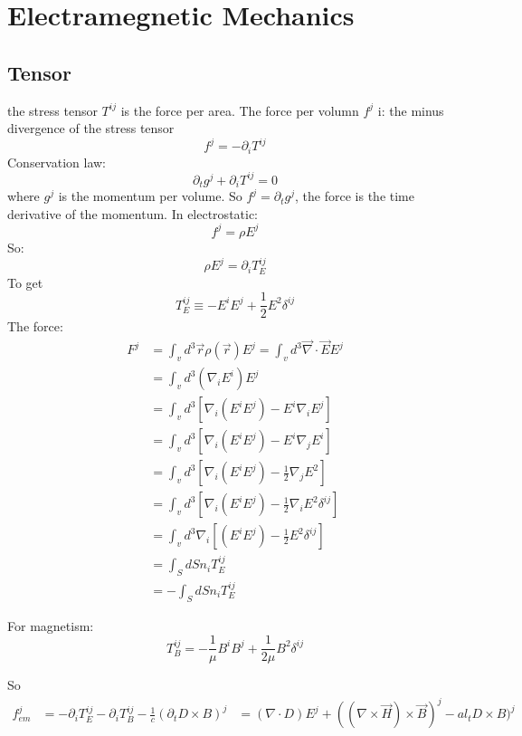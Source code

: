 \chapter{Electramegnetic Mechanics}

\section{Tensor}
the stress tensor $T^{ij}$ is the force per area. The force per volumn $f^j$
i: the minus divergence of the stress tensor
\[ f^j = -\partial_iT^{ij} \]
Conservation law:
\[  \partial_tg^j+\partial_iT^{ij} = 0 \]
where $g^j$ is the momentum per volume. So $f^j=\partial_tg^j$, the force is
the time derivative of the momentum.
In electrostatic:
\[  f^j = \rho E^j \]
So:
\[  \rho E^j = \partial_iT_E^{ij} \]
To get 
\[  T_E^{ij} \equiv -E^iE^j + \frac{1}{2}E^2\delta^{ij} \]
The force:
\begin{equation*}
\begin{aligned}  
    F^j &= \int_v d^3\vec{r}\rho(\vec{r})E^j = \int_v d^3\vec{\nabla}\cdot\vec{E}E^j	\\
	&= \int_v d^3(\nabla_iE^i)E^j \\
	&= \int_v d^3 [\nabla_i(E^iE^j) - E^i\nabla_iE^j ] \\
	&= \int_v d^3 [\nabla_i(E^iE^j) - E^i\nabla_jE^i ] \\
	&= \int_v d^3 [\nabla_i(E^iE^j) - \frac{1}{2}\nabla_jE^2 ] \\
	&= \int_v d^3 [\nabla_i(E^iE^j) - \frac{1}{2}\nabla_iE^2\delta^{ij} ] \\
	&= \int_v d^3 \nabla_i [(E^iE^j) - \frac{1}{2}E^2\delta^{ij} ] \\
	&= \int_S dS n_i T_E^{ij} \\
	&= -\int_S dS n_i T_E^{ij} 
\end{aligned}  
\end{equation*}

For magnetism:
\[  T_B^{ij} = -\frac{1}{\mu}B^iB^j + \frac{1}{2\mu}B^2\delta^{ij} \]

So
\[
    \begin{aligned}
	f^j_{em} &= -\partial_iT_E^{ij} - \partial_iT_B^{ij} - \frac{1}{c}(\partial_tD\times B)^j
    &= (\nabla\cdot D)E^j + ((\nabla\times\vec{H})\times\vec{B})^j - al_tD\times B)^j 
    \end{aligned}
\]
